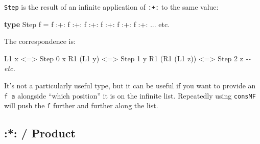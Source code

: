 \documentclass[]{article}
\newenvironment{Shaded}{}{}
\newcommand{\CommentTok}[1]{\textcolor[rgb]{0.38,0.63,0.69}{\textit{#1}}}
\newcommand{\DataTypeTok}[1]{\textcolor[rgb]{0.56,0.13,0.00}{#1}}
\newcommand{\DecValTok}[1]{\textcolor[rgb]{0.25,0.63,0.44}{#1}}
\newcommand{\KeywordTok}[1]{\textcolor[rgb]{0.00,0.44,0.13}{\textbf{#1}}}
\newcommand{\NormalTok}[1]{#1}
\newcommand{\OperatorTok}[1]{\textcolor[rgb]{0.40,0.40,0.40}{#1}}
\newcommand{\OtherTok}[1]{\textcolor[rgb]{0.00,0.44,0.13}{#1}}
\begin{document}
\begin{itemize}
  \texttt{Step} is the result of an infinite application of \texttt{:+:} to the
  same value:

\begin{Shaded}
\begin{Highlighting}[]
\KeywordTok{type} \DataTypeTok{Step}\NormalTok{ f }\OtherTok{=}\NormalTok{ f }\OperatorTok{:+:}\NormalTok{ f }\OperatorTok{:+:}\NormalTok{ f }\OperatorTok{:+:}\NormalTok{ f }\OperatorTok{:+:}\NormalTok{ f }\OperatorTok{:+:}\NormalTok{ f }\OperatorTok{:+:} \OperatorTok{...}\NormalTok{ etc}\OperatorTok{.}
\end{Highlighting}
\end{Shaded}

  The correspondence is:

\begin{Shaded}
\begin{Highlighting}[]
\DataTypeTok{L1}\NormalTok{ x           }\OperatorTok{<=>} \DataTypeTok{Step} \DecValTok{0}\NormalTok{ x}
\DataTypeTok{R1}\NormalTok{ (}\DataTypeTok{L1}\NormalTok{ y)      }\OperatorTok{<=>} \DataTypeTok{Step} \DecValTok{1}\NormalTok{ y}
\DataTypeTok{R1}\NormalTok{ (}\DataTypeTok{R1}\NormalTok{ (}\DataTypeTok{L1}\NormalTok{ z)) }\OperatorTok{<=>} \DataTypeTok{Step} \DecValTok{2}\NormalTok{ z}
\CommentTok{{-}{-} etc.}
\end{Highlighting}
\end{Shaded}

  It's not a particularly useful type, but it can be useful if you want to
  provide an \texttt{f\ a} alongside ``which position'' it is on the infinite
  list. Repeatedly using \texttt{consMF} will push the \texttt{f} further and
  further along the list.
\end{itemize}

\hypertarget{product}{%
\subsection{:*: / Product}\label{product}}
\end{document}
